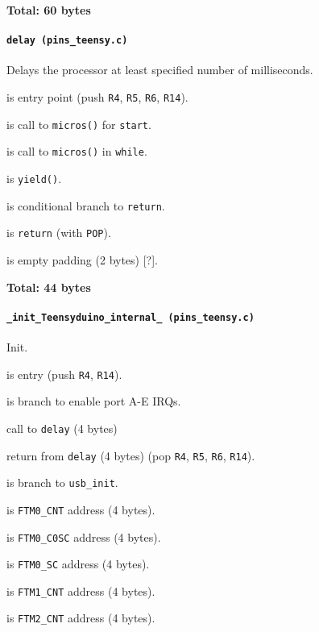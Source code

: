 \textbf{Total: 60 bytes}

\paragraph{\texttt{delay (pins\_teensy.c)}} Delays the processor at least
specified number of milliseconds.

 is entry point (push \texttt{R4}, \texttt{R5},
\texttt{R6}, \texttt{R14}).

 is call to \texttt{micros()} for \texttt{start}.

 is call to \texttt{micros()} in \texttt{while}.

 is \texttt{yield()}.

 is conditional branch to \texttt{return}.

 is \texttt{return} (with \texttt{POP}).

 is empty padding (2 bytes) [?].

\textbf{Total: 44 bytes}

\paragraph{\texttt{\_init\_Teensyduino\_internal\_ (pins\_teensy.c)}}
Init.

 is entry (push \texttt{R4}, \texttt{R14}).

 is branch to enable port A-E IRQs.

 call to \texttt{delay} (4 bytes)

 return from \texttt{delay} (4 bytes) (pop \texttt{R4},
\texttt{R5}, \texttt{R6}, \texttt{R14}).

 is branch to \texttt{usb\_init}.

\vspace{1em}

 is \texttt{FTM0\_CNT} address (4 bytes).

 is \texttt{FTM0\_C0SC} address (4 bytes).

 is \texttt{FTM0\_SC} address (4 bytes).

 is \texttt{FTM1\_CNT} address (4 bytes).

 is \texttt{FTM2\_CNT} address (4 bytes).

